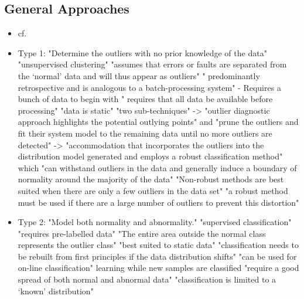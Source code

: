 	\subsection{General Approaches}
	\begin{itemize}
		\item cf. \textcite{Hodge2004}
		\item Type 1: "Determine the outliers with no prior knowledge of the data" \parencite{Hodge2004}
		\subitem "unsupervised clustering" \parencite{Hodge2004}
		\subitem "assumes that errors or faults are separated from the ‘normal’ data and will thus appear as outliers" \parencite{Hodge2004}
		\subitem " predominantly retrospective and is analogous to a batch-processing system" \parencite{Hodge2004} - Requires a bunch of data to begin with
		\subitem " requires that all data be available before processing" \parencite{Hodge2004}
		\subitem "data is static" \parencite{Hodge2004}
		\subitem "two sub-techniques" \parencite{Hodge2004}
		\subitem -> "outlier diagnostic approach highlights the potential outlying points" \parencite{Hodge2004} and "prune the outliers and fit their system model to the remaining data until no more outliers are detected" \parencite{Hodge2004}
		\subitem -> "accommodation that incorporates the outliers into the distribution model generated and employs a robust classification method" \parencite{Hodge2004} which "can withstand outliers in the data and generally induce a boundary of normality around the majority of the data" \parencite{Hodge2004}
		\subitem "Non-robust methods are best suited when there are only a few outliers in the data set" \parencite{Hodge2004}
		\subitem "a robust method must be used if there are a large number of outliers to prevent this distortion" \parencite{Hodge2004}
		\item Type 2: "Model both normality and abnormality." \parencite{Hodge2004}
		\subitem "supervised classification" \parencite{Hodge2004}
		\subitem "requires pre-labelled data" \parencite{Hodge2004}
		\subitem "The entire area outside the normal class represents the outlier class" \parencite{Hodge2004}
		\subitem "best suited to static data" \parencite{Hodge2004} "classification needs to be rebuilt from first principles if the data distribution shifts" \parencite{Hodge2004}
		\subitem "can be used for on-line classification" \parencite{Hodge2004} learning while new samples are classified
		\subitem "require a good spread of both normal and abnormal data" \parencite{Hodge2004}
		\subitem "classification is limited to a ‘known’ distribution" \parencite{Hodge2004}

\end{itemize}
